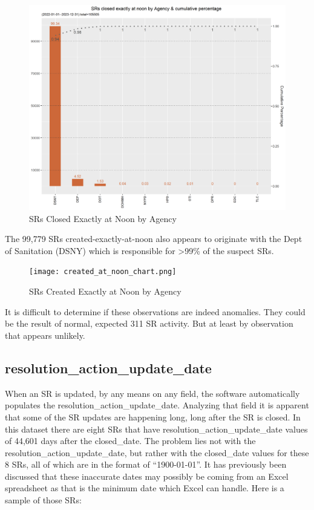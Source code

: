 \documentclass[12pt, titlepage]{article}
\begin{document}
	\begin{figure}[H]
		 \centering
		 \includegraphics[scale = 0.65]{closed_at_noon_chart.png}
		 \caption{SRs Closed Exactly at Noon by Agency}
		 \label{fig:noon-closed}
	\end{figure}	
	
	The 99,779 SRs created-exactly-at-noon also appears to originate with the Dept of Sanitation (DSNY) which
	is responsible for \textgreater{}99\% of the suspect SRs.
	
	\begin{figure}[H]
		 \centering
		 \texttt{[image: created\_at\_noon\_chart.png]}
		 \caption{SRs Created Exactly at Noon by Agency}
		 \label{fig:noon-created}
	\end{figure}		
		
	It is difficult to determine if these observations are indeed anomalies. They could be the result of normal, expected
	311 SR activity. But at least by observation that appears unlikely.	
		
		
		
	\subsection{resolution\_action\_update\_date}
	When an SR is updated, by any means on any field, the software automatically populates the resolution\_action\_update\_date. Analyzing that field
	it is apparent that some of the SR updates are happening long, long after the SR is closed. In this dataset there are eight SRs that have 
	resolution\_action\_update\_date values of 44,601 days after the closed\_date. The problem lies not with the resolution\_action\_update\_date, but
	rather with the closed\_date values for these 8 SRs, all of which are in the format of ``1900-01-01''. It has previously been discussed that these
	inaccurate dates may possibly be coming from an Excel spreadsheet as that is the minimum date which Excel can handle. Here is a sample
	of those SRs:
\end{document}
